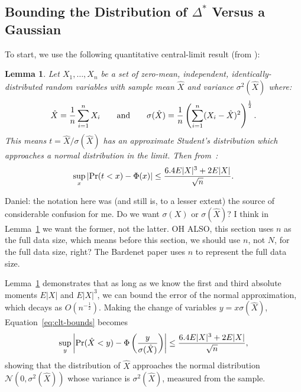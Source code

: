 \documentclass{article}
\newtheorem{lemma}{Lemma}
\begin{document}
\subsection{Bounding the Distribution of $\Delta^*$ Versus a Gaussian}\label{ssec:delta_star_distribution}

To start, we use the following quantitative central-limit result (from
\cite{explicit-clt05}):
  
\begin{lemma}\label{lem:quant_clt}
Let $X_1,\ldots,X_n$ be a set of zero-mean, independent, identically-distributed
random variables with sample mean $\hat{X}$ and variance $\sigma^2(\hat{X})$
where:
\begin{equation}
    \hat{X} = \frac{1}{n}\sum_{i=1}^nX_i \qquad {\rm and} \qquad \sigma(\hat{X}) = \frac{1}{n}\left(\sum_{i=1}^n(X_i-\hat{X})^2\right)^{\frac{1}{2}}.
\end{equation}
This means $t=\hat{X}/\sigma(\hat{X})$ has an approximate Student's distribution
which approaches a normal distribution in the limit. Then
from~\cite{explicit-clt05}:
\begin{equation}\label{eq:clt-bounds}
    \sup_x|{\rm Pr}(t<x) - \Phi(x)| \leq \frac{6.4E|X|^3+2E|X|}{\sqrt{n}}.
\end{equation}
\end{lemma}

{\color{blue} Daniel: the notation here was (and still is, to a lesser extent)
the source of considerable confusion for me. Do we want $\sigma(X)$ or
$\sigma(\hat{X})$? I think in Lemma~\ref{lem:quant_clt} we want the former, not
the latter. OH ALSO, this section uses $n$ as the full data size, which means
before this section, we should use $n$, not $N$, for the full data size, right?
The Bardenet paper uses $n$ to represent the full data size.}

Lemma~\ref{lem:quant_clt} demonstrates that as long as we know the first and
third absolute moments $E|X|$ and $E|X|^3$, we can bound the error of the normal
approximation, which decays as $O(n^{-\frac{1}{2}})$. Making the change of
variables $y = x \sigma(\hat{X})$, Equation~\ref{eq:clt-bounds} becomes
\begin{equation}\label{eq:clt-bounds2}
   \sup_y\left|{\rm Pr}(\hat{X}< y) - \Phi\left(\frac{y}{\sigma(\hat{X})}\right)\right| \leq \frac{6.4E|X|^3+2E|X|}{\sqrt{n}},
\end{equation}
showing that the distribution of $\hat{X}$ approaches the normal distribution
$\mathcal{N}(0,\sigma^2(\hat{X}))$ whose variance is $\sigma^2(\hat{X})$,
measured from the sample.
\end{document}

